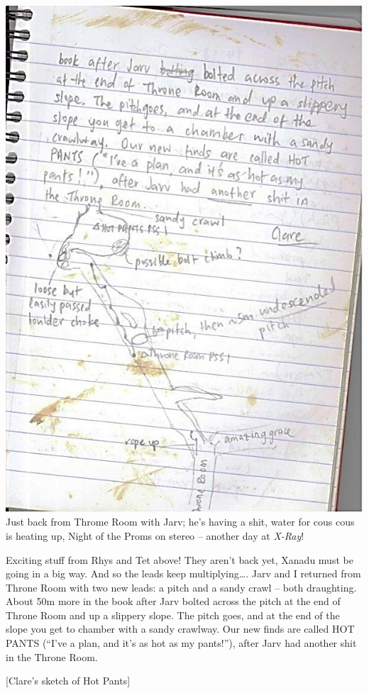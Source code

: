 \includegraphics{UgLog1012/68.jpeg}Just back from Throme Room with Jarv;
he's having a shit, water for cous cous is heating up, Night of the
Proms on stereo -- another day at \emph{X-Ray}!

Exciting stuff from Rhys and Tet above! They aren't back yet, Xanadu
must be going in a big way. And so the leads keep multiplying\ldots{}.
Jarv and I returned from Throne Room with two new leads: a pitch and a
sandy crawl -- both draughting. About 50m more in the book after Jarv
bolted across the pitch at the end of Throne Room and up a slippery
slope. The pitch goes, and at the end of the slope you get to chamber
with a sandy crawlway. Our new finds are called HOT PANTS (``I've a
plan, and it's as hot as my pants!''), after Jarv had another shit in
the Throne Room.

{[}Clare's sketch of Hot Pants{]}


